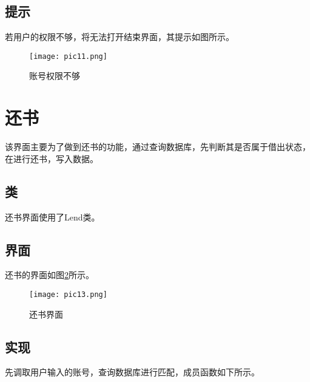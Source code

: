 \documentclass[forprint]{shmtu}
\begin{document}
\subsection{提示}

若用户的权限不够，将无法打开结束界面，其提示如图所示。

\begin{figure}[!htbp]
	\centering
	\texttt{[image: pic11.png]}
	\caption{账号权限不够}
	\label{pic:11}
\end{figure}

\section{还书}

该界面主要为了做到还书的功能，通过查询数据库，先判断其是否属于借出状态，在进行还书，写入数据。

\subsection{类}

还书界面使用了Lend类。

\subsection{界面}

还书的界面如图\ref{pic:13}所示。

\begin{figure}[!htbp]
	\centering
	\texttt{[image: pic13.png]}
	\caption{还书界面}
	\label{pic:13}
\end{figure}

\subsection{实现}

先调取用户输入的账号，查询数据库进行匹配，成员函数如下所示。
\end{document}
